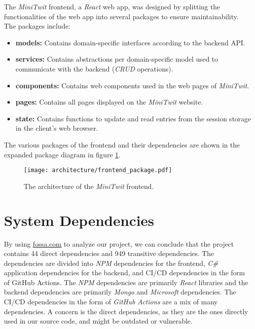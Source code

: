 The \textit{MiniTwit} frontend, a \textit{React} web app, was designed by splitting the functionalities of the web app into several packages to ensure maintainability. The packages include:

\begin{itemize}
    \item \textbf{models:} Contains domain-specific interfaces according to the backend API.
    \item \textbf{services:} Contains abstractions per domain-specific model used to communicate with the backend (\textit{CRUD} operations).
    \item \textbf{components:} Contains web components used in the web pages of \textit{MiniTwit}.
    \item \textbf{pages:} Contains all pages displayed on the \textit{MiniTwit} website.
    \item \textbf{state:} Contains functions to update and read entries from the session storage in the client's web browser.
\end{itemize}

The various packages of the frontend and their dependencies are shown in the expanded package diagram in figure \ref{fig:frontend-architecture}.

\begin{figure}[H]
    \centering
    \texttt{[image: architecture/frontend\_package.pdf]}
    \caption{The architecture of the \textit{MiniTwit} frontend.}
    \label{fig:frontend-architecture}
\end{figure}

\section{System Dependencies}

By using \url{fossa.com} to analyze our project, we can conclude that the project contains 44 direct dependencies and 949 transitive dependencies. The dependencies are divided into \textit{NPM} dependencies for the frontend, \textit{C\#} application dependencies for the backend, and CI/CD dependencies in the form of GitHub Actions. The \textit{NPM} dependencies are primarily \textit{React} libraries and the backend dependencies are primarily \textit{Mongo} and \textit{Microsoft} dependencies. The CI/CD dependencies in the form of \textit{GitHub Actions }are a mix of many dependencies. A concern is the direct dependencies, as they are the ones directly used in our source code, and might be outdated or vulnerable.

